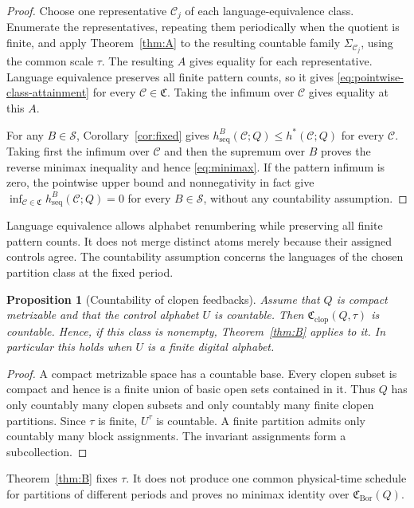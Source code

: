 \documentclass[11pt,reqno]{amsart}
\numberwithin{equation}{section}
\newtheorem{proposition}[theorem]{Proposition}
\theoremstyle{definition}
\theoremstyle{definition}
\newcommand{\C}{\mathcal C}
\newcommand{\hseq}{h_{\mathrm{seq}}}
\newcommand{\hpat}{h^{*}}
\newcommand{\Bor}{\mathrm{Bor}}
\newcommand{\clop}{\mathrm{clop}}
\begin{document}
\begin{proof}
Choose one representative $\C_j$ of each language-equivalence class.
Enumerate the representatives, repeating them periodically when the quotient
is finite, and apply Theorem~\ref{thm:A} to the resulting countable family
$\Sigma_{\C_j}$, using the common scale $\tau$.  The resulting $A$ gives equality for each
representative.  Language equivalence preserves all finite pattern counts, so
it gives \eqref{eq:pointwise-class-attainment} for every $\C\in\mathfrak C$.
Taking the infimum over $\C$ gives equality at this $A$.

For any $B\in\mathscr S$, Corollary~\ref{cor:fixed} gives
$\hseq^B(\C;Q)\le\hpat(\C;Q)$ for every $\C$.  Taking first the infimum over
$\C$ and then the supremum over $B$ proves the reverse minimax inequality and
hence \eqref{eq:minimax}.  If the pattern infimum is zero, the pointwise upper
bound and nonnegativity in fact give
$\inf_{\C\in\mathfrak C}\hseq^B(\C;Q)=0$ for every $B\in\mathscr S$, without
any countability assumption.
\end{proof}

Language equivalence allows alphabet renumbering while preserving all
finite pattern counts. It does not merge distinct atoms merely because
their assigned controls agree. The countability assumption concerns
the languages of the chosen partition class at the fixed period.

\begin{proposition}[Countability of clopen feedbacks]
\label{prop:digital}
Assume that $Q$ is compact metrizable and that the control alphabet $U$ is
countable.  Then
$\mathfrak C_{\clop}(Q,\tau)$ is countable.  Hence, if this class is nonempty,
Theorem~\ref{thm:B} applies to it.  In particular this holds when $U$ is a
finite digital alphabet.
\end{proposition}

\begin{proof}
A compact metrizable space has a countable base.  Every clopen subset is
compact and hence is a finite union of basic open sets contained in it.  Thus
$Q$ has only countably many clopen subsets and only countably many finite
clopen partitions.  Since $\tau$ is finite, $U^\tau$ is countable.  A finite
partition admits only countably many block assignments.  The invariant assignments form a
subcollection.
\end{proof}

Theorem~\ref{thm:B} fixes $\tau$.  It does not produce one common
physical-time schedule for partitions of different periods and proves no
minimax identity over $\mathfrak C_{\Bor}(Q)$.
\end{document}
